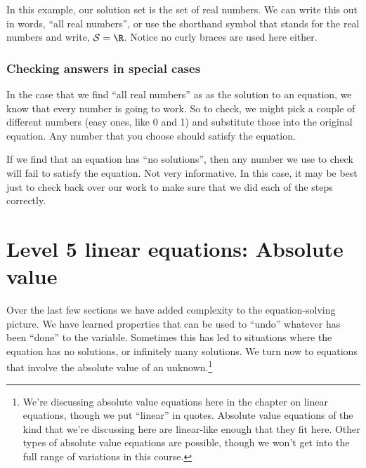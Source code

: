 In this example, our solution set is the set of real numbers. We can write this out in words, ``all real numbers'', or use the shorthand symbol that stands for the real numbers and write, $\mathcal{S} = \R$. Notice no curly braces are used here either.

\subsubsection{Checking answers in special cases}

In the case that we find ``all real numbers'' as as the solution to an equation, we know that every number is going to work. So to check, we might pick a couple of different numbers (easy ones, like 0 and 1) and substitute those into the original equation. Any number that you choose should satisfy the equation.

If we find that an equation has ``no solutions'', then any number we use to check will fail to satisfy the equation. Not very informative. In this case, it may be best just to check back over our work to make sure that we did each of the steps correctly.

\section{Level 5 linear equations: Absolute value}
\label{sec:linearlevel5}

Over the last few sections we have added complexity to the equation-solving picture. We have learned properties that can be used to ``undo'' whatever has been ``done'' to the variable. Sometimes this has led to situations where the equation has no solutions, or infinitely many solutions. We turn now to equations that involve the absolute value of an unknown.\footnote{We're discussing absolute value equations here in the chapter on linear equations, though we put ``linear'' in quotes. Absolute value equations of the kind that we're discussing here are linear-like enough that they fit here. Other types of absolute value equations are possible, though we won't get into the full range of variations in this course.}


